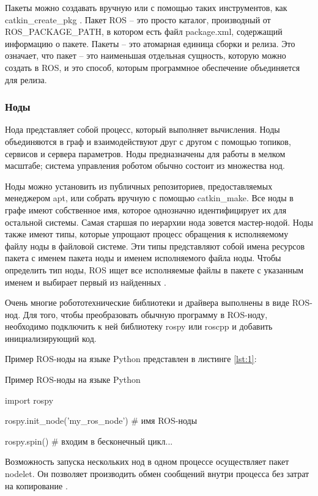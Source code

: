 Пакеты можно создавать вручную или с помощью таких инструментов, как catkin\_create\_pkg . Пакет ROS -- это просто каталог, производный от ROS\_PACKAGE\_PATH, в котором есть файл package.xml, содержащий информацию о пакете. Пакеты -- это атомарная единица сборки и релиза. Это означает, что пакет -- это наименьшая отдельная сущность, которую можно создать в ROS, и это способ, которым программное обеспечение объединяется для релиза.

\subsubsection{Ноды}
Нода представляет собой процесс, который выполняет вычисления. Ноды объединяются в граф и взаимодействуют друг с другом с помощью топиков, сервисов и сервера параметров. Ноды предназначены для работы в мелком масштабе; система управления роботом обычно состоит из множества нод.

Ноды можно установить из публичных репозиториев, предоставляемых менеджером apt, или собрать вручную с помощью catkin\_make.
Все ноды в графе имеют собственное имя, которое однозначно идентифицирует их для остальной системы. Самая старшая по иерархии нода зовется мастер-нодой. Ноды также имеют типы, которые упрощают процесс обращения к исполняемому файлу ноды в файловой системе. Эти типы представляют собой имена ресурсов пакета с именем пакета ноды и именем исполняемого файла ноды. Чтобы определить тип ноды, ROS ищет все исполняемые файлы в пакете с указанным именем и выбирает первый из найденных \cite{ros}. 

Очень многие робототехнические библиотеки и драйвера выполнены в виде ROS-нод.
Для того, чтобы преобразовать обычную программу в ROS-ноду, необходимо подключить к ней библиотеку rospy или roscpp и добавить инициализирующий код.

Пример ROS-ноды на языке Python представлен в листинге \ref{lst:1}:

\begin{Program}[H]
	\caption{Пример ROS-ноды на языке Python} \label{lst:1}
\begin{MyCode}
import rospy

rospy.init_node('my_ros_node')  # имя ROS-ноды

rospy.spin()  # входим в бесконечный цикл...
\end{MyCode}
\end{Program}

Возможность запуска нескольких нод в одном процессе осуществляет пакет nodelet. Он позволяет производить обмен сообщений внутри процесса без затрат на копирование \cite{ros}.


